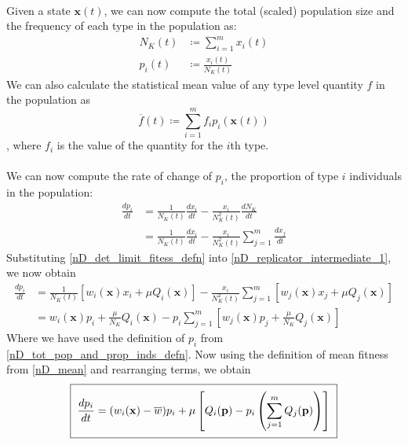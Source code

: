 \\
Given a state $\mathbf{x}(t)$, we can now compute the total (scaled) population size and the frequency of each type in the population as:
\begin{equation}
\label{nD_tot_pop_and_prop_inds_defn}
\begin{aligned}
N_{K}(t) &\coloneqq \sum\limits_{i=1}^{m}x_i(t)\\
p_i(t) &\coloneqq \frac{x_i(t)}{N_{K}(t)}
\end{aligned}
\end{equation}
We can also calculate the statistical mean value of any type level quantity $f$ in the population as
\begin{equation}
\label{nD_mean}
\overline{f}(t) \coloneqq \sum\limits_{i=1}^{m}f_ip_{i}(\mathbf{x}(t))
\end{equation}
, where $f_i$ is the value of the quantity for the $i$th type.\\
\\
We can now compute the rate of change of $p_i$, the proportion of type $i$ individuals in the population:
\begin{align}
\frac{dp_i}{dt} &= \frac{1}{N_{K}(t)}\frac{dx_i}{dt} - \frac{x_i}{N_{K}^2(t)}\frac{dN_{K}}{dt}\nonumber\\
&= \frac{1}{N_{K}(t)}\frac{dx_i}{dt} - \frac{x_i}{N_{K}^2(t)}\sum\limits_{j=1}^{m}\frac{dx_j}{dt}\label{nD_replicator_intermediate_1}
\end{align}
Substituting \eqref{nD_det_limit_fitess_defn} into \eqref{nD_replicator_intermediate_1}, we now obtain
\begin{align*}
\frac{dp_i}{dt} &=  \frac{1}{N_{K}(t)}\left[w_i(\mathbf{x})x_i + \mu Q_i(\mathbf{x})\right] - \frac{x_i}{N_{K}^2(t)}\sum\limits_{j=1}^{m}\left[w_j(\mathbf{x})x_j + \mu Q_j(\mathbf{x})\right]\\
&= w_i(\mathbf{x})p_i + \frac{\mu}{N_K}Q_i(\mathbf{x}) - p_i\sum\limits_{j=1}^{m}\left[w_j(\mathbf{x})p_j + \frac{\mu}{N_K}Q_j(\mathbf{x})\right]
\end{align*}
Where we have used the definition of $p_i$ from \eqref{nD_tot_pop_and_prop_inds_defn}. Now using the definition of mean fitness from \eqref{nD_mean} and rearranging terms, we obtain
\begin{equation}
\label{nD_replicator_mutator}
\setlength{\fboxsep}{2\fboxsep}\boxed{\frac{dp_i}{dt} = (w_i(\mathbf{x}) - \overline{w})p_i + \mu\left[Q_i(\mathbf{p}) - p_i\left(\sum\limits_{j=1}^{m}Q_j(\mathbf{p})\right)\right]}
\end{equation}
